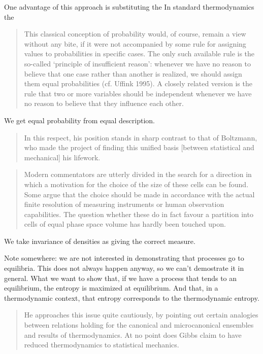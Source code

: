 \documentclass{article}
\begin{document}
One advantage of this approach is substituting the In standard thermodynamics the 

\begin{quote}
	This classical conception of probability would, of course, remain a view without any bite, if it
	were not accompanied by some rule for assigning values to probabilities in specific cases. The only
	such available rule is the so-called ‘principle of insufficient reason’: whenever we have no reason to
	believe that one case rather than another is realized, we should assign them equal probabilities (cf.
	Uffink 1995). A closely related version is the rule that two or more variables should be independent
	whenever we have no reason to believe that they influence each other.
\end{quote}
We get equal probability from equal description.

\begin{quote}
	In this respect, his position stands in sharp contrast to that of Boltzmann, who made the project of	finding this unified basis [between statistical and mechanical] his lifework.
\end{quote}

\begin{quote}
	Modern commentators are utterly divided in the search for a direction in which a motivation
	for the choice of the size of these cells can be found. Some argue that the choice should be made
	in accordance with the actual finite resolution of measuring instruments or human observation capabilities.
	The question whether these do in fact favour a partition into cells of equal phase space
	volume has hardly been touched upon.
\end{quote}
We take invariance of densities as giving the correct measure.

Note somewhere: we are not interested in demonstrating that processes go to equilibria. This does not always happen anyway, so we can't demostrate it in general. What we want to show that, if we have a process that tends to an equilibrium, the entropy is maximized at equilibrium. And that, in a thermodynamic context, that entropy corresponds to the thermodynamic entropy.

\begin{quote}
	He approaches this issue quite cautiously, by pointing out certain analogies
	between relations holding for the canonical and microcanonical ensembles and results of thermodynamics.
	At no point does Gibbs claim to have reduced thermodynamics to statistical mechanics.
\end{quote}
	

\end{document}
